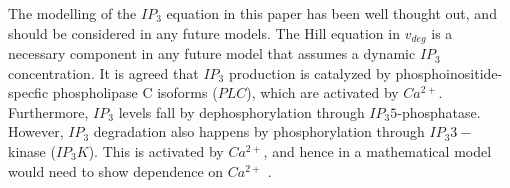 The modelling of the $IP_3$ equation in this paper has been well thought out, and should be considered in any future models. The Hill equation in $v_{deg}$ is a necessary component in any future model that assumes a dynamic $IP_3$ concentration. It is agreed that $IP_3$ production is catalyzed by phosphoinositide-specfic phospholipase C isoforms ($PLC$), which are activated by $Ca^{2+}$. Furthermore, $IP_3$ levels fall by dephosphorylation through $IP_3 5$-phosphatase. However, $IP_3$ degradation also happens by phosphorylation through $IP_3 3-$kinase ($IP_3K$). This is activated by $Ca^{2+}$, and hence in a mathematical model would need to show dependence on $Ca^{2+}$ \cite{hofer}.
